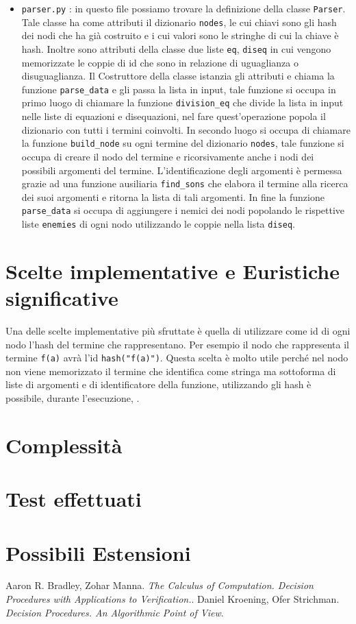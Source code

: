 \documentclass[a4paper, 11pt]{article}
\begin{document}
\begin{itemize}
\item \verb|parser.py| : in questo file possiamo trovare la definizione della classe \verb|Parser|. Tale classe ha come attributi il dizionario \verb|nodes|, le cui chiavi sono gli hash dei nodi che ha già costruito e i cui valori sono le stringhe di cui la chiave è hash. Inoltre sono attributi della classe due liste \verb|eq|, \verb|diseq| in cui vengono memorizzate le coppie di id che sono in relazione di uguaglianza o disuguaglianza. Il Costruttore della classe istanzia gli attributi e chiama la funzione \verb|parse_data| e gli passa la lista in input, tale funzione si occupa in primo luogo di chiamare la funzione \verb|division_eq| che divide la lista in input nelle liste di equazioni e disequazioni, nel fare quest'operazione popola il dizionario con tutti i termini coinvolti. In secondo luogo si occupa di chiamare la funzione \verb|build_node| su ogni termine del dizionario \verb|nodes|, tale funzione si occupa di creare il nodo del termine e ricorsivamente anche i nodi dei possibili argomenti del termine. L'identificazione degli argomenti è permessa grazie ad una funzione ausiliaria \verb|find_sons| che elabora il termine alla ricerca dei suoi argomenti e ritorna la lista di tali argomenti. In fine la funzione \verb|parse_data| si occupa di aggiungere i nemici dei nodi popolando le rispettive liste \verb|enemies| di ogni nodo utilizzando le coppie nella lista \verb|diseq|.
\end{itemize}

\section*{Scelte implementative e Euristiche significative}
Una delle scelte implementative più sfruttate è quella di utilizzare come id di ogni nodo l'hash del termine che rappresentano. Per esempio il nodo che rappresenta il termine \verb|f(a)| avrà l'id \verb|hash("f(a)")|. Questa scelta è molto utile perché nel nodo non viene memorizzato il termine che identifica come stringa ma sottoforma di liste di argomenti e di identificatore della funzione, utilizzando gli hash è possibile, durante l'esecuzione, .

\section*{Complessità}

\section*{Test effettuati}

\section*{Possibili Estensioni}

\begin{thebibliography}{2}
 Aaron R. Bradley, Zohar Manna. \emph{The Calculus of Computation. Decision Procedures with Applications to Verification.}.
  Daniel Kroening, Ofer Strichman. \emph{Decision Procedures. An Algorithmic Point of View}.
\end{thebibliography}
\end{document}
